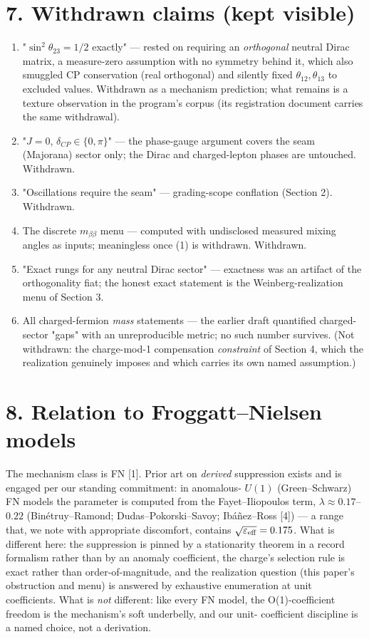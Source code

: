 \documentclass[11pt]{article}
\begin{document}
\section*{7. Withdrawn claims (kept visible)}
\begin{enumerate}
\item "$\sin^2\theta_{23} = 1/2$ exactly" — rested on requiring an \emph{orthogonal} neutral Dirac matrix, a measure-zero assumption with no symmetry behind it, which also smuggled CP conservation (real orthogonal) and silently fixed $\theta_{12}, \theta_{13}$ to excluded values.  Withdrawn as a mechanism prediction; what remains is a texture observation in the program's corpus (its registration document carries the same withdrawal).
\item "$J = 0$, $\delta_{CP} \in \{0, \pi\}$" — the phase-gauge argument covers the seam (Majorana) sector only; the Dirac and charged-lepton phases are untouched.  Withdrawn.
\item "Oscillations require the seam" — grading-scope conflation (Section 2).  Withdrawn.
\item The discrete $m_{\beta\beta}$ menu — computed with undisclosed measured mixing angles as inputs; meaningless once (1) is withdrawn.  Withdrawn.
\item "Exact rungs for any neutral Dirac sector" — exactness was an artifact of the orthogonality fiat; the honest exact statement is the Weinberg-realization menu of Section 3.
\item All charged-fermion \emph{mass} statements — the earlier draft quantified charged-sector "gaps" with an unreproducible metric; no such number survives.  (Not withdrawn: the charge-mod-1 compensation \emph{constraint} of Section 4, which the realization genuinely imposes and which carries its own named assumption.)
\end{enumerate}
\section*{8. Relation to Froggatt–Nielsen models}
The mechanism class is FN [1].  Prior art on \emph{derived} suppression exists and is engaged per our standing commitment: in anomalous- $U(1)$ (Green–Schwarz) FN models the parameter is computed from the Fayet–Iliopoulos term, $\lambda \approx 0.17$–$0.22$ (Binétruy–Ramond; Dudas–Pokorski–Savoy; Ibáñez–Ross [4]) — a range that, we note with appropriate discomfort, contains $\sqrt{\varepsilon_{\rm eff}} = 0.175$.  What is different here: the suppression is pinned by a stationarity theorem in a record formalism rather than by an anomaly coefficient, the charge's selection rule is exact rather than order-of-magnitude, and the realization question (this paper's obstruction and menu) is answered by exhaustive enumeration at unit coefficients.  What is \emph{not} different: like every FN model, the O(1)-coefficient freedom is the mechanism's soft underbelly, and our unit- coefficient discipline is a named choice, not a derivation.
\end{document}
